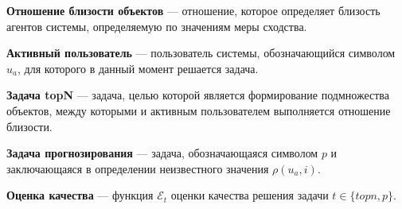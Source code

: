 \textbf{Отношение близости объектов} --- отношение, которое определяет
близость агентов системы, определяемую по значениям меры сходства.

\textbf{Активный пользователь} --- пользователь системы, обозначающийся
символом $u_a$, для которого в данный момент решается задача.

\textbf{Задача topN} --- задача, целью которой является формирование
подмножества объектов, между которыми и активным пользователем выполняется
отношение близости.

\textbf{Задача прогнозирования} --- задача, обозначающаяся символом $p$ и
заключающаяся в определении неизвестного значения $\rho(u_a, i)$.

\textbf{Оценка качества} --- функция $\mathcal{E}_t$ оценки качества решения
задачи $t \in \{topn, p\}$.

